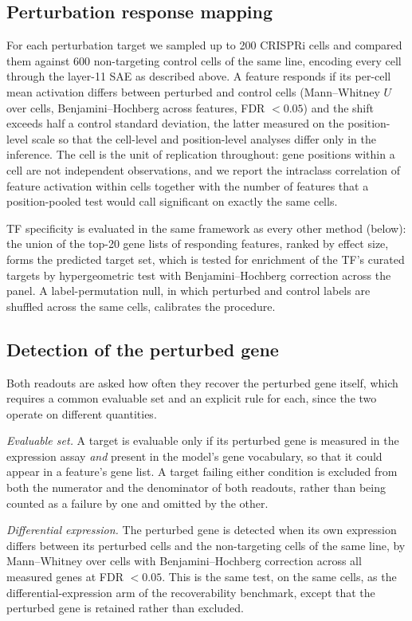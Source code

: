 \subsection*{Perturbation response mapping}

For each perturbation target we sampled up to 200 CRISPRi cells and compared them against 600
non-targeting control cells of the same line, encoding every cell through the layer-11 SAE as
described above. A feature responds if its per-cell mean activation differs between perturbed and
control cells (Mann--Whitney $U$ over cells, Benjamini--Hochberg across features, FDR $< 0.05$) and
the shift exceeds half a control standard deviation, the latter measured on the position-level
scale so that the cell-level and position-level analyses differ only in the inference. The cell is the unit of replication throughout: gene positions
within a cell are not independent observations, and we report the intraclass correlation of feature
activation within cells together with the number of features that a position-pooled test would call
significant on exactly the same cells.

TF specificity is evaluated in the same framework as every other method (below): the union of the
top-20 gene lists of responding features, ranked by effect size, forms the predicted target set,
which is tested for enrichment of the TF's curated targets by hypergeometric test with
Benjamini--Hochberg correction across the panel. A label-permutation null, in which perturbed and
control labels are shuffled across the same cells, calibrates the procedure.

\subsection*{Detection of the perturbed gene}

Both readouts are asked how often they recover the perturbed gene itself, which requires a common
evaluable set and an explicit rule for each, since the two operate on different quantities.

\emph{Evaluable set.} A target is evaluable only if its perturbed gene is measured in the
expression assay \emph{and} present in the model's gene vocabulary, so that it could appear in a
feature's gene list. A target failing either condition is excluded from both the numerator and the
denominator of both readouts, rather than being counted as a failure by one and omitted by the
other.

\emph{Differential expression.} The perturbed gene is detected when its own expression differs
between its perturbed cells and the non-targeting cells of the same line, by Mann--Whitney over
cells with Benjamini--Hochberg correction across all measured genes at FDR $< 0.05$. This is the
same test, on the same cells, as the differential-expression arm of the recoverability benchmark,
except that the perturbed gene is retained rather than excluded.

